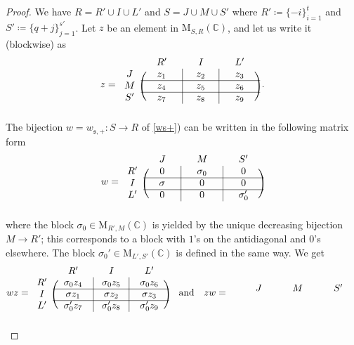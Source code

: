\documentclass[ALCO,Unicode]{cedram}
\newcommand{\fs}{\mathfrak{s}}
\newcommand{\Mat}{\mathrm{M}}
\newcommand{\mC}{\mathbb{C}}
\begin{document}
\begin{proof}
We have $R=R'\cup I\cup L'$ and $S=J\cup M\cup S'$ where $R'\coloneqq \{-i\}_{i=1}^t$
and $S'\coloneqq \{q+j\}_{j=1}^{s'}$.
Let $z$ be an element in $\Mat_{S,R}(\mC)$, and let us write it (blockwise) as
\begin{equation}
\label{z}
z=\begin{blockarray}{cccc}
{} & {\quad R'\quad} & {\quad I\quad} & {\quad L'\quad}\\
\begin{block}{c(c|c|c)}
J & z_1 & z_2 & z_3\\
\cline{2-4}
M & z_4 & z_5 & z_6\\
\cline{2-4}
S' & z_7 & z_8 & z_9\\
\end{block}
\end{blockarray}\,.\end{equation}
The bijection $w=w_{\fs,+}:S\to R$ of \eqref{ws+}) can be written in the following matrix form
\[
w=\begin{blockarray}{cccc}
{} & {\quad J\quad} & {\quad M\quad} & {\quad S'\quad}\\
\begin{block}{c(c|c|c)}
R' & 0 & \sigma_0 & 0\\
\cline{2-4}
I & \sigma & 0 & 0\\
\cline{2-4}
L' & 0 & 0 & \sigma_0'\\
\end{block}
\end{blockarray}
\]
where the block $\sigma_0\in\Mat_{R',M}(\mC)$ is yielded by the unique decreasing bijection $M\to R'$; this corresponds to a block with $1$'s on the antidiagonal and $0$'s elsewhere. The block $\sigma_0'\in\Mat_{L',S'}(\mC)$ is defined in the same way.
We get
\[ wz=\begin{blockarray}{cccc}
{} & {\quad R'\quad} & {\quad I\quad} & {\quad L'\quad}\\
\begin{block}{c(c|c|c)}
R' & \sigma_0 z_4 & \sigma_0 z_5 & \sigma_0 z_6\\
\cline{2-4}
I & \sigma z_1 & \sigma z_2 & \sigma z_3\\
\cline{2-4}
L' & \sigma_0' z_7 & \sigma_0' z_8 & \sigma_0' z_9\\
\end{block}
\end{blockarray} \quad
\mbox{and}\quad
zw=\begin{blockarray}{cccc}
{} & {\quad J\quad} & {\quad M\quad} & {\quad S'\quad}\\

\end{blockarray}\]
\end{proof}
\end{document}
